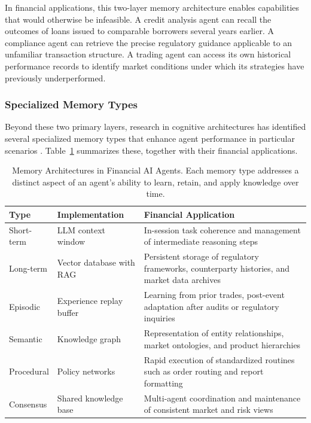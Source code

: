\documentclass{article}
\begin{document}
In financial applications, this two-layer memory architecture enables capabilities that would otherwise be infeasible. A credit analysis agent can recall the outcomes of loans issued to comparable borrowers several years earlier. A compliance agent can retrieve the precise regulatory guidance applicable to an unfamiliar transaction structure. A trading agent can access its own historical performance records to identify market conditions under which its strategies have previously underperformed.

\subsubsection{Specialized Memory Types}
Beyond these two primary layers, research in cognitive architectures has identified several specialized memory types that enhance agent performance in particular scenarios \cite{park2023generative}. Table~\ref{tab:memory-types} summarizes these, together with their financial applications.

\begin{table}[htbp]
  \centering
  \caption{Memory Architectures in Financial AI Agents. Each memory type addresses a distinct aspect of an agent’s ability to learn, retain, and apply knowledge over time.}
  \label{tab:memory-types}
  \renewcommand{\arraystretch}{1.4}
  \begin{tabular}{|p{2cm}|p{3.3cm}|p{5.6cm}|}
    \hline
    \textbf{Type} & \textbf{Implementation} & \textbf{Financial Application} \\
    \hline
    Short-term   
      & LLM context window        
      & In-session task coherence and management of intermediate reasoning steps \\
    \hline
    Long-term    
      & Vector database with RAG     
      & Persistent storage of regulatory frameworks, counterparty histories, and market data archives \\
    \hline
    Episodic     
      & Experience replay buffer  
      & Learning from prior trades, post-event adaptation after audits or regulatory inquiries \\
    \hline
    Semantic     
      & Knowledge graph           
      & Representation of entity relationships, market ontologies, and product hierarchies \\
    \hline
    Procedural   
      & Policy networks           
      & Rapid execution of standardized routines such as order routing and report formatting \\
    \hline
    Consensus    
      & Shared knowledge base     
      & Multi-agent coordination and maintenance of consistent market and risk views \\
    \hline
  \end{tabular}
\end{table}
\end{document}
